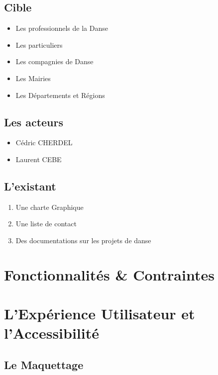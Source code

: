 \documentclass[11pt,a4paper]{report}
\begin{document}
		\subsection{Cible}
			\begin{itemize}
				\item Les professionnels de la Danse
				\item Les particuliers
				\item Les compagnies de Danse
				\item Les Mairies
				\item Les Départements et Régions
			\end{itemize}
		\subsection{Les acteurs}
			\begin{itemize}
				\item Cédric CHERDEL
				\item Laurent CEBE
			\end{itemize}
		\subsection{L'existant}
			\begin{enumerate}
				\item Une charte Graphique
				\item Une liste de contact
				\item Des documentations sur les projets de danse
			\end{enumerate}
	\section{Fonctionnalités \& Contraintes}
		\paragraph*{}
	\section{L'Expérience Utilisateur et l'Accessibilité}
		\subsection{Le Maquettage}
\end{document}
